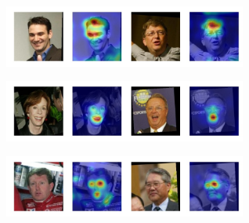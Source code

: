 \begin{figure}[th!]
\captionsetup[subfigure]{labelformat=empty}
    \centering
    \begin{subfigure}
        \centering
        \includegraphics[width=8cm, trim={0 1cm 0 0},clip]{saliency-new/saliency-smooth/bald-1.jpeg}
        \footnotesize
        \vspace{0.4cm}
    \end{subfigure}
    
    \begin{subfigure}
        \centering
        \includegraphics[width=8cm, trim={0 1cm 0 0},clip]{saliency-new/saliency-smooth/smile-1.jpeg}
        \footnotesize
        \vspace{0.4cm}
    \end{subfigure}
    
    \begin{subfigure}
        \centering
        \includegraphics[width=8cm, trim={0 1cm 0 0},clip]{saliency-new/saliency-smooth/eyesopen-1.jpeg}
        \footnotesize
        \vspace{0.4cm}
    \end{subfigure}
    

\end{figure}
